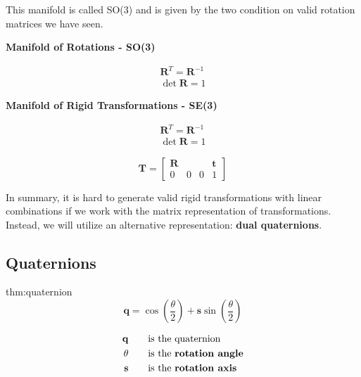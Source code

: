 \documentclass{article}
\begin{document}
This manifold is called SO(3) and is given by the two condition on valid rotation matrices we have seen.

\vspace{10px}

\textbf{Manifold of Rotations - SO(3)}

\begin{gather*}
    \mathbf{R}^T=\mathbf{R}^{-1}\\
    \det \mathbf{R}= 1
\end{gather*}


\textbf{Manifold of Rigid Transformations - SE(3)}

\begin{center}
    \begin{minipage}{0.2\textwidth}
        \begin{gather*}
            \mathbf{R}^T=\mathbf{R}^{-1}\\
            \det \mathbf{R}= 1
        \end{gather*}
    \end{minipage}
    \begin{minipage}{0.2\textwidth}
        \[
            \mathbf{T} = 
            \begin{bmatrix}
                \mathbf{R} & & & \!\!\mathbf{t}\\
                0 & \!\!\!0 & \!\!\!0 & \!\!\!1
            \end{bmatrix}
        \]
    \end{minipage}  
\end{center}

In summary, it is hard to generate valid rigid transformations with linear combinations if we work with the matrix
representation of transformations.
Instead, we will utilize an alternative representation: \textbf{dual quaternions}.

\newpage

\subsection{Quaternions}

\begin{defin}[Quaternion]{thm:quaternion}
    \[
        \mathbf{q} = \cos \left(\frac{\theta}{2}\right) + \mathbf{s} \sin\left(\frac{\theta}{2}\right)
    \]

    \vspace{-20px}

    \begin{center}
        \begin{alignat*}{2}
            \mathbf{q}& \quad &&\text{is the quaternion}\\
            \theta& &&\text{is the \textbf{rotation angle}}\\
            \mathbf{s}& &&\text{is the \textbf{rotation axis}}
        \end{alignat*}
    \end{center}
\end{defin}
\end{document}
